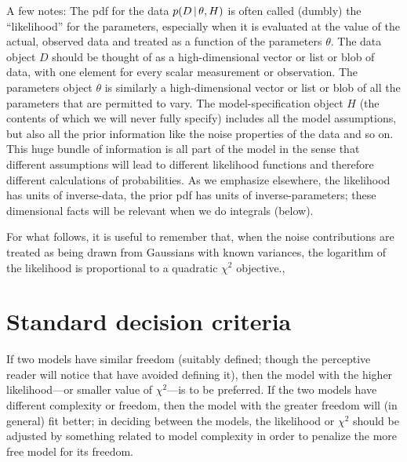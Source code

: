 \documentclass[12pt,twoside]{article}
\newcommand{\data}{D}
\newcommand{\pars}{\theta}
\begin{document}
A few notes: The pdf for the data $p(\data\given\pars, H)$ is often
called (dumbly) the ``likelihood'' for the
parameters, especially when it is evaluated at the value of the
actual, observed data and treated as a function of the parameters
$\pars$.  The data object $\data$ should be thought of as a
high-dimensional vector or list or blob of data, with one element for
every scalar measurement or observation.  The parameters object
$\pars$ is similarly a high-dimensional vector or list or blob of all
the parameters that are permitted to vary.  The model-specification
object $H$ (the contents of which we will never fully specify) includes all the model
assumptions, but also all the prior information like the noise
properties of the data and so on.  This huge bundle of information is
all part of the model in the sense that different assumptions will
lead to different likelihood functions and therefore different
calculations of probabilities.  As we emphasize elsewhere, the likelihood has units of
inverse-data, the prior pdf has units of inverse-parameters; these
dimensional facts will be relevant when we do integrals (below).

For what follows, it is useful to remember that, when the noise
contributions are treated as being drawn from Gaussians with known
variances, the logarithm of the likelihood is proportional to a
quadratic $\chi^2$ objective.,  

\section{Standard decision criteria}

If two models have similar freedom (suitably defined; though the
perceptive reader will notice that have avoided defining it), then the model with
the higher likelihood---or smaller value of $\chi^2$---is to be
preferred.  If the two models have different complexity or freedom,
then the model with the greater freedom will (in general) fit better;
in deciding between the models, the likelihood or $\chi^2$ should be
adjusted by something related to model complexity in order to penalize
the more free model for its freedom.
\end{document}
